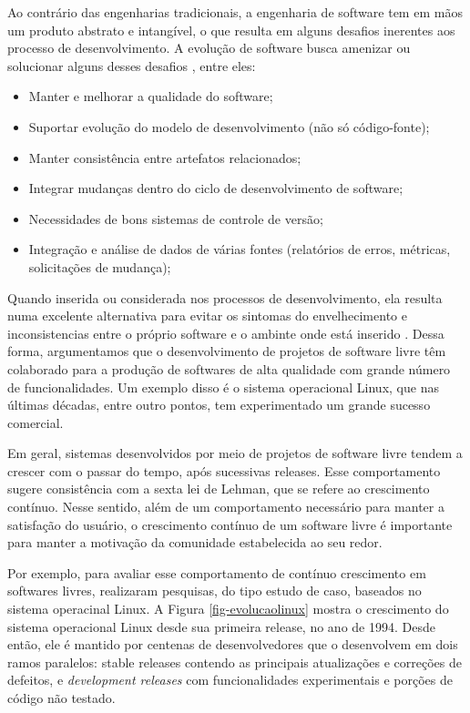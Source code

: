 Ao contrário das engenharias tradicionais, a engenharia de software tem em mãos um produto abstrato e intangível, o que resulta em alguns desafios inerentes aos processo de desenvolvimento. A evolução de software busca amenizar ou solucionar alguns desses desafios \cite{mens2005challenges}, entre eles:

\begin{itemize}
\item Manter e melhorar a qualidade do software;
\item Suportar evolução do modelo de desenvolvimento (não só código-fonte);
\item Manter consistência entre artefatos relacionados;
\item Integrar mudanças dentro do ciclo de desenvolvimento de software;
\item Necessidades de bons sistemas de controle de versão;
\item Integração e análise de dados de várias fontes (relatórios de erros, métricas, solicitações de mudança);
\end{itemize}

Quando inserida ou considerada nos processos de desenvolvimento, ela resulta numa excelente alternativa para evitar os sintomas do envelhecimento e inconsistencias entre o próprio software e o ambinte onde está inserido \cite{mens2005challenges}.
Dessa forma, argumentamos que o desenvolvimento de projetos de software livre têm colaborado para a produção de softwares de alta qualidade com grande número de funcionalidades. Um exemplo disso é o sistema operacional Linux, que nas últimas décadas, entre outro pontos, tem experimentado um grande sucesso comercial.

Em geral, sistemas desenvolvidos por meio de projetos de software livre tendem a crescer com o passar do tempo, após sucessivas releases. Esse comportamento sugere consistência com a sexta lei de Lehman, que se refere ao crescimento contínuo. Nesse sentido, além de um comportamento necessário para manter a satisfação do usuário, o crescimento contínuo de um software livre é importante para manter a motivação da comunidade estabelecida ao seu redor.

Por exemplo, para avaliar esse comportamento de contínuo crescimento em softwares livres,  realizaram pesquisas, do tipo estudo de caso, baseados no sistema operacinal Linux.
%
A Figura \ref{fig-evolucaolinux} mostra o crescimento do sistema operacional Linux desde sua primeira release, no ano de 1994. Desde então, ele é mantido por centenas de desenvolvedores que o desenvolvem em dois ramos paralelos: stable releases contendo as principais atualizações e correções de defeitos, e \textit{development releases} com funcionalidades experimentais e porções de código não testado.

